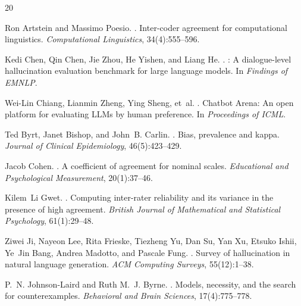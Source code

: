 \documentclass[11pt,a4paper]{article}
\begin{document}

\begin{thebibliography}{20}

Ron Artstein and Massimo Poesio.
.
\newblock Inter-coder agreement for computational linguistics.
\newblock \emph{Computational Linguistics}, 34(4):555--596.

Kedi Chen, Qin Chen, Jie Zhou, He Yishen, and Liang He.
.
: A dialogue-level hallucination evaluation benchmark for large language models.
\newblock In \emph{Findings of EMNLP}.

Wei-Lin Chiang, Lianmin Zheng, Ying Sheng, et~al.
.
\newblock Chatbot {A}rena: An open platform for evaluating {LLM}s by human preference.
\newblock In \emph{Proceedings of ICML}.

Ted Byrt, Janet Bishop, and John~B. Carlin.
.
\newblock Bias, prevalence and kappa.
\newblock \emph{Journal of Clinical Epidemiology}, 46(5):423--429.

Jacob Cohen.
.
\newblock A coefficient of agreement for nominal scales.
\newblock \emph{Educational and Psychological Measurement}, 20(1):37--46.

Kilem~Li Gwet.
.
\newblock Computing inter-rater reliability and its variance in the presence of high agreement.
\newblock \emph{British Journal of Mathematical and Statistical Psychology}, 61(1):29--48.

Ziwei Ji, Nayeon Lee, Rita Frieske, Tiezheng Yu, Dan Su, Yan Xu, Etsuko Ishii, Ye~Jin Bang, Andrea Madotto, and Pascale Fung.
.
\newblock Survey of hallucination in natural language generation.
\newblock \emph{ACM Computing Surveys}, 55(12):1--38.

P.~N. Johnson-Laird and Ruth M.~J. Byrne.
.
\newblock Models, necessity, and the search for counterexamples.
\newblock \emph{Behavioral and Brain Sciences}, 17(4):775--778.


\end{thebibliography}
\end{document}
